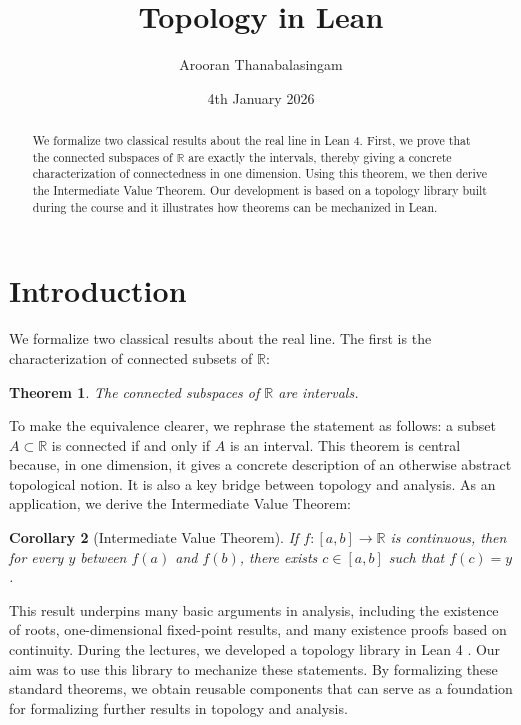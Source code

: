 \documentclass[11pt, oneside]{article}
\title{Topology in Lean}
\author{Arooran Thanabalasingam}
\date{4th January 2026}
\theoremstyle{plain}
\newtheorem{thm}{Theorem}[section]
\newtheorem{cor}[thm]{Corollary}
\theoremstyle{definition}
\newcommand{\R}{\mathbb{R}}
\begin{document}
\maketitle

\begin{abstract}
    We formalize two classical results about the real line in Lean 4. First, we prove that the connected subspaces of $\mathbb{R}$ are exactly the intervals, thereby giving a concrete characterization of connectedness in one dimension. Using this theorem, we then derive the Intermediate Value Theorem. Our development is based on a topology library built during the course and it illustrates how theorems can be mechanized in Lean.
\end{abstract}


\section{Introduction}

We formalize two classical results about the real line. The first is the characterization of connected subsets of $\mathbb{R}$:
\begin{thm}
\label{thm-1}
The connected subspaces of $\R$ are intervals. \cite{topoBook}
\end{thm}
To make the equivalence clearer, we rephrase the statement as follows: a subset $A \subset \R$ is connected if and only if $A$ is an interval.
This theorem is central because, in one dimension, it gives a concrete description of an otherwise abstract topological notion. It is also a key bridge between topology and analysis. As an application, we derive the Intermediate Value Theorem:  
\begin{cor}[Intermediate Value Theorem]
\label{thm-2}
If $f: [a,b] \to \mathbb{R}$ is continuous, then for every  $y$ between  $f(a)$ and $f(b)$, there exists $c \in [a,b]$ such that $ f(c) = y$. \cite{wikipediaIVT}
\end{cor}


This result underpins many basic arguments in analysis, including the existence of roots, one-dimensional fixed-point results, and many existence proofs based on continuity.
During the lectures, we developed a topology library in Lean 4 \cite{course}. Our aim was to use this library to mechanize these statements.
By formalizing these standard theorems, we obtain reusable components that can serve as a foundation for formalizing further results in topology and analysis.
\end{document}
